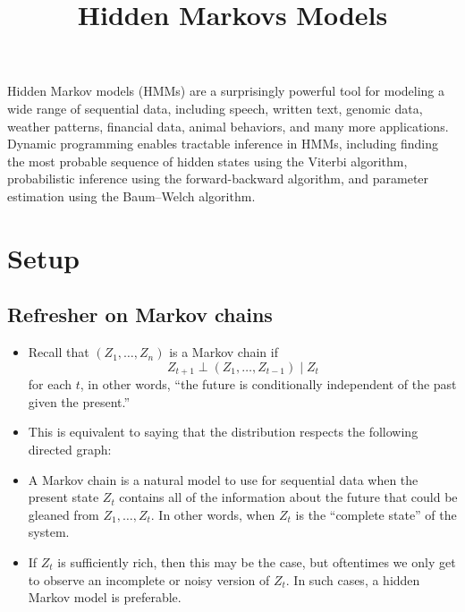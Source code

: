 \documentclass[12pt]{article}
\title{Hidden Markovs Models}
\author{}
\date{}
\begin{document}
\maketitle

\tableofcontents



\vspace{2em}


Hidden Markov models (HMMs) are a surprisingly powerful tool for modeling a wide range of sequential data, including speech, written text, genomic data, weather patterns, financial data, animal behaviors, and many more applications. Dynamic programming enables tractable inference in HMMs, including finding the most probable sequence of hidden states using the Viterbi algorithm, probabilistic inference using the forward-backward algorithm, and parameter estimation using the Baum--Welch algorithm.

\newpage

\section{Setup}

\subsection{Refresher on Markov chains}
\begin{itemize}
\item Recall that $(Z_1,\ldots,Z_n)$ is a Markov chain if
$$ Z_{t +1} \perp (Z_1,\ldots,Z_{t -1}) \mid Z_t $$
for each $t$, in other words, ``the future is conditionally independent of the past given the present.''
\item This is equivalent to saying that the distribution respects the following directed graph:

\item A Markov chain is a natural model to use for sequential data when the present state $Z_t$ contains all of the information about the future that could be gleaned from $Z_1,\ldots,Z_t$. In other words, when $Z_t$ is the ``complete state'' of the system.
\item If $Z_t$ is sufficiently rich, then this may be the case, but oftentimes we only get to observe an incomplete or noisy version of $Z_t$. In such cases, a hidden Markov model is preferable.
\end{itemize}
\end{document}
